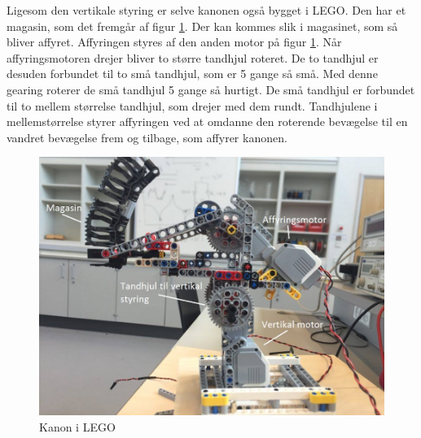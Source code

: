 Ligesom den vertikale styring er selve kanonen også bygget i LEGO. Den har et magasin, som det fremgår af figur \ref{fig:kanon}. Der kan kommes slik i magasinet, som så bliver affyret. Affyringen styres af den anden motor på figur \ref{fig:kanon}. Når affyringsmotoren drejer bliver to større tandhjul roteret. De to tandhjul er desuden forbundet til to små tandhjul, som er 5 gange så små. Med denne gearing roterer de små tandhjul 5 gange så hurtigt. De små tandhjul er forbundet til to mellem størrelse tandhjul, som drejer med dem rundt. Tandhjulene i mellemstørrelse styrer affyringen ved at omdanne den roterende bevægelse til en vandret bevægelse frem og tilbage, som affyrer kanonen.

\begin{figure}[H]
	\centering
	\includegraphics[width=1\textwidth]{Afsnit/DesignOgImplementering/images/kanon}
	\caption{Kanon i LEGO}
	\label{fig:kanon}
\end{figure}











